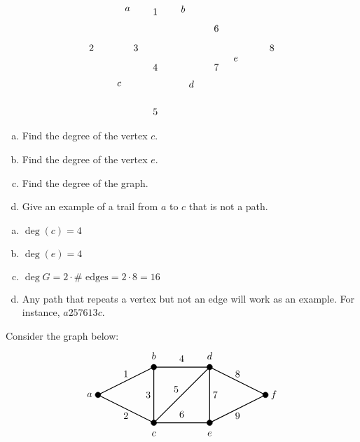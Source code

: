 \documentclass[12pt,letterpaper]{exam}
\begin{document}
\begin{questions}
\[\begin{tikzpicture}
	\node at (1,2.3) {$1$};
	\node at (-1.3,1) {$2$};
	\node at (0.3,1) {$3$};
	\node at (1,0.3) {$4$};
	\node at (1,-1.3) {$5$};
	\node at (3.2,1.7) {$6$};
	\node at (3.2,0.3) {$7$};
	\node at (5.2,1) {$8$};
	
	\node at (0,2.4) {$a$};
	\node at (2,2.4) {$b$};
	\node at (-0.3,-0.3) {$c$};
	\node at (2.3,-0.3) {$d$};
	\node at (3.9,0.6) {$e$};
	\end{tikzpicture}
	\]

\begin{enumerate}[(a)]
\item Find the degree of the vertex $c$.
\item Find the degree of the vertex $e$. 
\item Find the degree of the graph. 
\item Give an example of a trail from $a$ to $c$ that is not a path. 
\end{enumerate} \pspace

\sol 
\begin{enumerate}[(a)]
\item $\deg(c)= 4$ \pspace

\item $\deg(e)= 4$ \pspace

\item $\deg G= 2 \cdot \# \text{ edges}= 2 \cdot 8=16$ \pspace

\item Any path that repeats a vertex but not an edge will work as an example. For instance, $a257613c$.
\end{enumerate}



\newpage
\question[10]  Consider the graph below:
	\[
	\begin{tikzpicture}
	\draw[line width=0.03cm] (0,2) -- (-2,1) -- (0,0);
	\draw[line width=0.03cm] (2,2) -- (0,2) -- (0,0) -- (2,0) -- (4,1) -- (2,2) -- (2,0);
	\draw[line width=0.03cm] (0,0) -- (2,2);
	
	\draw[fill=black] (-2,1) circle (0.1);
	\draw[fill=black] (0,0) circle (0.1);
	\draw[fill=black] (0,2) circle (0.1);
	\draw[fill=black] (2,0) circle (0.1);
	\draw[fill=black] (2,2) circle (0.1);
	\draw[fill=black] (4,1) circle (0.1);
	
	\node at (-2.3,1) {$a$};
	\node at (0,2.4) {$b$};
	\node at (0,-0.4) {$c$};
	\node at (2,2.4) {$d$};
	\node at (2,-0.4) {$e$};
	\node at (4.3,1) {$f$};
	
	\node at (-1,1.75) {$1$};
	\node at (-1,0.25) {$2$};
	\node at (-0.2,1) {$3$};
	\node at (1,2.3) {$4$};
	\node at (0.8,1.2) {$5$};
	\node at (1,0.3) {$6$};
	\node at (2.2,1) {$7$};
	\node at (3,1.75) {$8$};
	\node at (3,0.25) {$9$};
	\end{tikzpicture}
	\]


\end{questions}
\end{document}
